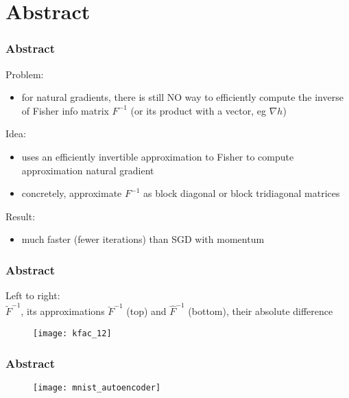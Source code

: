 \section{Abstract}

\begin{frame}
\frametitle{Abstract}

Problem:
\begin{itemize}
    \item for natural gradients, there is still NO way to efficiently compute
        the inverse of Fisher info matrix $F^{-1}$ (or its product with a vector, eg $\nabla h$)
\end{itemize}

Idea:
\begin{itemize}
    \item uses an efficiently invertible approximation to Fisher to compute approximation natural gradient
    \item concretely, approximate $F^{-1}$ as block diagonal or block tridiagonal matrices
\end{itemize}

Result:
\begin{itemize}
    \item much faster (fewer iterations) than SGD with momentum
\end{itemize}

\end{frame}

\begin{frame}
\frametitle{Abstract}
{\footnotesize
Left to right: \\
$\tilde{F}^{-1}$, its approximations $\breve{F}^{-1}$ (top) and $\hat{F}^{-1}$ (bottom), their absolute difference
}
\begin{figure}
    \centering
    \texttt{[image: kfac\_12]}
\end{figure}
\end{frame}

\begin{frame}
\frametitle{Abstract}
\begin{figure}
    \centering
    \texttt{[image: mnist\_autoencoder]}
\end{figure}
\end{frame}
